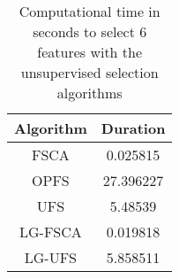\begin{table}
	\begin{center}
		\begin{tabular}{c c}
			Algorithm & Duration \\
			\hline
			FSCA & 0.025815 \\
			OPFS & 27.396227 \\
			UFS & 5.48539 \\
			LG-FSCA & 0.019818 \\
			LG-UFS & 5.858511 \\
		\end{tabular}
	\end{center}
	\caption{Computational time in seconds to select 6 features with the unsupervised selection algorithms}
\end{table}